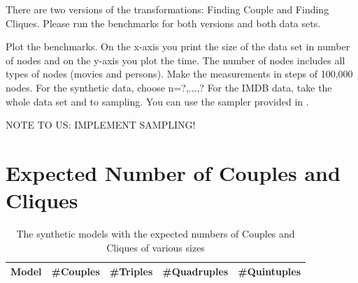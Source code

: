 \documentclass[a4paper,11pt]{article}
\begin{document}
There are two versions of the transformations: Finding Couple and Finding Cliques.
Please run the benchmarks for both versions and both data sets.


Plot the benchmarks. On the x-axis you print the size of the data set
in number of nodes and on the y-axis you plot the time. The number of nodes
includes all types of nodes (movies and persons). Make the measurements in
steps of 100,000 nodes. For the synthetic data, choose n=?,...,?
For the IMDB data, take the whole data set and to sampling. You can use
the sampler provided in \cite{IMDB2EMF}.

NOTE TO US: IMPLEMENT SAMPLING!






\appendix

\section{Expected Number of Couples and Cliques}
\label{sec:expected-numbers}

\begin{table}[h!]
  \centering
  \begin{tabular}{| l | r | r | r | r |}
  \hline
  \textbf{Model} & \textbf{\#Couples} & \textbf{\#Triples} & \textbf{\#Quadruples} & \textbf{\#Quintuples}\\
  \hline
  \hline
\end{tabular}
\caption{The synthetic models with the expected numbers of Couples and Cliques of various sizes}
\label{tab:synthetic-numbers}
\end{table}
\end{document}
